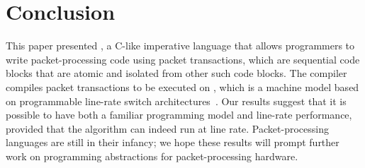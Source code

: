 \section{Conclusion}
\label{s:conclusion}
This paper presented \pktlanguage, a C-like imperative language that allows
programmers to write packet-processing code using packet transactions, which are
sequential code blocks that are atomic and isolated from other such code
blocks. The \pktlanguage compiler compiles packet transactions to be executed on
\absmachine,
which is a machine model based on programmable line-rate switch
architectures~\cite{flexpipe, xpliant, rmt}. Our results suggest that it is
possible to have both a familiar programming model and line-rate
performance, provided that the algorithm can indeed run at line rate.
Packet-processing languages are still in their infancy; we hope these results
will prompt further work on programming abstractions for packet-processing hardware.
